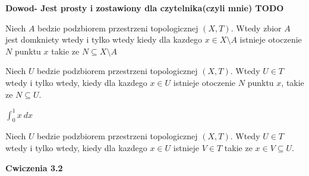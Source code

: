 \documentclass{article}
\begin{document}
\textbf{Dowod- Jest prosty i zostawiony dla czytelnika(czyli mnie) TODO}

\begin{tcolorbox}[colback=white!90!cyan,colframe=black!35!cyan,title=3.2.7 Wniosek: Otoczenie i domknietosc zbioru A]

    Niech $A$ bedzie podzbiorem przestrzeni topologicznej $(X,T)$. Wtedy zbior $A$ jest domkniety wtedy i tylko wtedy kiedy dla kazdego $x \in X\setminus A$ istnieje otoczenie $N$ punktu $x$ takie ze $N \subseteq X\setminus A$

\end{tcolorbox}

\begin{tcolorbox}[colback=white!90!cyan,colframe=black!35!cyan,title=3.2.8 Wniosek: Otoczenie i otwartosc zbioru A]

    Niech $U$ bedzie podzbiorem przestrzeni topologicznej $(X,T)$. Wtedy $U\in T$ wtedy i tylko wtedy, kiedy dla kazdego $x\in U$ istnieje otoczenie $N$ punktu $x$, takie ze $N\subseteq U$.

    $\int_{{0}}^{{1}} {x} \: d{x} {}$

\end{tcolorbox}

\begin{tcolorbox}[colback=white!90!cyan,colframe=black!35!cyan,title=3.2.9 Wniosek: Otoczenie i otwartosc zbioru A: v2]
    Niech $U$ bedzie podzbiorem przestrzeni topologicznej $(X,T)$. Wtedy $U\in T$ wtedy i tylko wtedy, kiedy dla kazdego $x\in U$ istnieje $V \in T$ takie ze $x\in V \subseteq U.$

\end{tcolorbox}



\textbf{Cwiczenia 3.2}

\hrulefill
\end{document}
